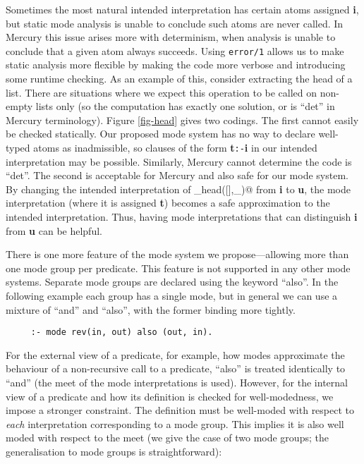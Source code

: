 \documentclass{tlp}
\begin{document}
Sometimes the most natural intended interpretation has certain atoms
assigned \textbf{i}, but static mode analysis is unable to conclude
such atoms are never called.  In Mercury this issue arises more with
determinism, when analysis is unable to conclude that a given
atom always succeeds.
Using \texttt{error/1} allows us to make static analysis more flexible
by making the code more verbose and introducing some runtime checking.
As an example of this, consider extracting the head of a list.  
There are situations
where we expect this operation to be called on non-empty lists only
(so the computation has exactly one solution, or is ``det'' in Mercury
terminology).  Figure \ref{fig-head} gives two codings.  The first
cannot easily be checked statically.  Our proposed mode system has
no way to declare well-typed atoms as inadmissible, so clauses of the
form \textbf{t}\texttt{:-}\textbf{i} in our intended interpretation may
be possible.  Similarly, Mercury cannot determine the code is ``det''.
The second is acceptable for Mercury and also safe for our mode system.
By changing the intended interpretation of \verb@checked_head([],_)@ from
\textbf{i} to \textbf{u}, the mode interpretation (where it is assigned
\textbf{t}) becomes a safe approximation to the intended interpretation.
Thus, having mode interpretations that can distinguish \textbf{i} 
from \textbf{u} can be helpful.

There is one more feature of the mode system we propose---allowing more
than one mode group per predicate.  This feature is not supported in any
other mode systems.  Separate mode groups are declared using the keyword
``also''.  In the following example each group has a single mode, but in
general we can use a mixture of ``and'' and ``also'', with the former
binding more tightly.

\begin{verbatim}
     :- mode rev(in, out) also (out, in).
\end{verbatim}

\noindent
For the external view of a predicate, for example, how modes approximate
the behaviour of a non-recursive call to a predicate, ``also'' is
treated identically to ``and'' (the meet of the mode interpretations is
used).  However, for the internal view of a predicate and how its
definition is checked for well-modedness, we impose a
stronger constraint.  The definition must be well-moded
with respect to \emph{each} interpretation corresponding to a mode group.
This implies it is also well moded with respect to the meet (we give the
case of two mode groups; the generalisation to  mode groups is
straightforward):
\end{document}
